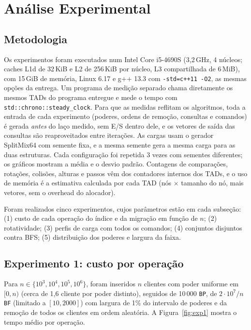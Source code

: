 \documentclass[letterpaper]{article} %
\begin{document}
\section{An\'alise Experimental}

\subsection{Metodologia}

Os experimentos foram executados num Intel Core i5-4690S (3,2\,GHz, 4 n\'ucleos; caches L1d de 32\,KiB e L2 de 256\,KiB por n\'ucleo, L3 compartilhada de 6\,MiB), com 15\,GiB de mem\'oria, Linux 6.17 e g++ 13.3 com \texttt{-std=c++11 -O2}, as mesmas op\c{c}\~oes da entrega. Um programa de medi\c{c}\~ao separado chama diretamente os mesmos TADs do programa entregue e mede o tempo com \texttt{std::chrono::steady\_clock}. Para que as medidas reflitam os algoritmos, toda a entrada de cada experimento (poderes, ordens de remo\c{c}\~ao, consultas e comandos) \'e gerada \emph{antes} do la\c{c}o medido, sem E/S dentro dele, e os vetores de sa\'ida das consultas s\~ao reaproveitados entre itera\c{c}\~oes. As cargas usam o gerador SplitMix64 \citep{steele2014} com semente fixa, e a mesma semente gera a mesma carga para as duas estruturas. Cada configura\c{c}\~ao foi repetida 3 vezes com sementes diferentes; os gr\'aficos mostram a m\'edia e o desvio padr\~ao. Contagens de compara\c{c}\~oes, rota\c{c}\~oes, colis\~oes, alturas e passos v\^em dos contadores internos dos TADs, e o uso de mem\'oria \'e a estimativa calculada por cada TAD (n\'os $\times$ tamanho do n\'o, mais vetores, sem o overhead do alocador).

Foram realizados cinco experimentos, cujos par\^ametros est\~ao em cada subse\c{c}\~ao: (1) custo de cada opera\c{c}\~ao do \'indice e da migra\c{c}\~ao em fun\c{c}\~ao de $n$; (2) rotatividade; (3) perfis de carga com todos os comandos; (4) conjuntos disjuntos contra BFS; (5) distribui\c{c}\~ao dos poderes e largura da faixa.

\subsection{Experimento 1: custo por opera\c{c}\~ao}

Para $n \in \{10^3, 10^4, 10^5, 10^6\}$, foram inseridos $n$ clientes com poder uniforme em $[0, n)$ (cerca de 1,6 cliente por poder distinto), seguidos de 10\,000 \texttt{BP}, de $2\cdot10^7/n$ \texttt{BF} (limitado a $[10, 2000]$) com largura de 1\% do intervalo de poderes e da remo\c{c}\~ao de todos os clientes em ordem aleat\'oria. A Figura~\ref{fig:exp1} mostra o tempo m\'edio por opera\c{c}\~ao.
\end{document}
